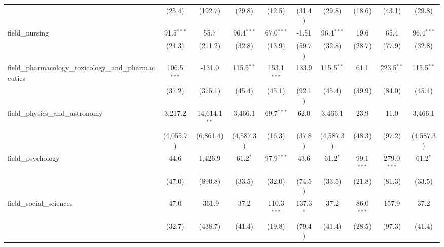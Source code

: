 \begin{tabular}{lccccccccc}
                                                               & (25.4)          & (192.7)         & (29.8)         & (12.5)        & (31.4)        & (29.8)         & (18.6)         & (43.1)        & (29.8)\\   
   field\_nursing                                              & 91.5$^{***}$    & 55.7            & 96.4$^{***}$   & 67.0$^{***}$  & -1.51         & 96.4$^{***}$   & 19.6           & 65.4          & 96.4$^{***}$\\   
                                                               & (24.3)          & (211.2)         & (32.8)         & (13.9)        & (59.7)        & (32.8)         & (28.7)         & (77.9)        & (32.8)\\   
   field\_pharmacology\_toxicology\_and\_pharmaceutics         & 106.5$^{***}$   & -131.0          & 115.5$^{**}$   & 153.1$^{***}$ & 133.9         & 115.5$^{**}$   & 61.1           & 223.5$^{**}$  & 115.5$^{**}$\\   
                                                               & (37.2)          & (375.1)         & (45.4)         & (45.1)        & (92.1)        & (45.4)         & (39.9)         & (84.0)        & (45.4)\\   
   field\_physics\_and\_astronomy                              & 3,217.2         & 14,614.1$^{**}$ & 3,466.1        & 69.7$^{***}$  & 62.0          & 3,466.1        & 23.9           & 11.0          & 3,466.1\\   
                                                               & (4,055.7)       & (6,861.4)       & (4,587.3)      & (16.3)        & (37.8)        & (4,587.3)      & (48.3)         & (97.2)        & (4,587.3)\\   
   field\_psychology                                           & 44.6            & 1,426.9         & 61.2$^{*}$     & 97.9$^{***}$  & 43.6          & 61.2$^{*}$     & 99.1$^{***}$   & 279.0$^{***}$ & 61.2$^{*}$\\   
                                                               & (47.0)          & (890.8)         & (33.5)         & (32.0)        & (74.5)        & (33.5)         & (21.8)         & (81.3)        & (33.5)\\   
   field\_social\_sciences                                     & 47.0            & -361.9          & 37.2           & 110.3$^{***}$ & 137.3$^{*}$   & 37.2           & 86.0$^{***}$   & 157.9         & 37.2\\   
                                                               & (32.7)          & (438.7)         & (41.4)         & (19.8)        & (79.4)        & (41.4)         & (28.5)         & (97.3)        & (41.4)\\   

\end{tabular}
